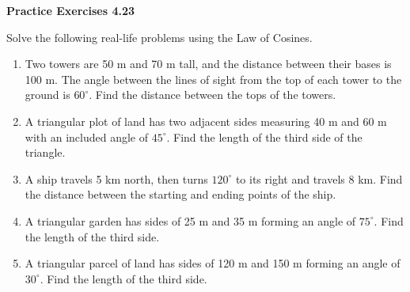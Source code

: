 \vspace{0.3ex}
\noindent\textbf{Practice Exercises 4.23}

\vspace{0.2ex}

Solve the following real-life problems using the Law of Cosines.

\begin{enumerate}
    \item Two towers are 50 m and 70 m tall, and the distance between their bases is 100 m. The angle between the lines of sight from the top of each tower to the ground is \(60^\circ\). Find the distance between the tops of the towers.
    \item A triangular plot of land has two adjacent sides measuring 40 m and 60 m with an included angle of \(45^\circ\). Find the length of the third side of the triangle.
    \item A ship travels 5 km north, then turns \(120^\circ\) to its right and travels 8 km. Find the distance between the starting and ending points of the ship.
    \item A triangular garden has sides of 25 m and 35 m forming an angle of \(75^\circ\). Find the length of the third side.
    \item A triangular parcel of land has sides of 120 m and 150 m forming an angle of \(30^\circ\). Find the length of the third side.
\end{enumerate}
